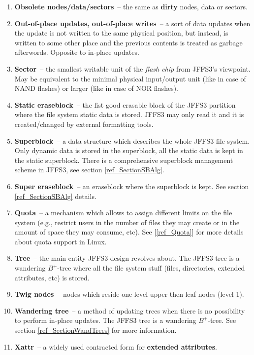 \documentclass[12pt,a4paper,oneside,titlepage]{article}
\begin{document}
\begin{enumerate}
\item \textbf{Obsolete nodes/data/sectors}~-- the same as \textbf{dirty} nodes,
data or sectors.

\item \textbf{Out-of-place updates, out-of-place writes}~-- a sort of data
updates when the update is not written to the same physical position, but
instead, is written to some other place and the previous contents is treated as
garbage afterwords. Opposite to \mbox{in-place} updates.

\item \textbf{Sector}~-- the smallest writable unit of the \emph{flash chip}
from JFFS3's viewpoint. May be equivalent to the minimal physical input/output
unit (like in case of NAND flashes) or larger (like in case of NOR flashes).

\item \textbf{Static eraseblock}~-- the fist good erasable block of the JFFS3
partition where the file system static data is stored. JFFS3 may
only read it and it is created/changed by external formatting tools.

\item \textbf{Superblock}~-- a data structure which describes the whole
JFFS3 file system. Only dynamic data is stored in the superblock, all the
static data is kept in the static superblock. There is a comprehensive
superblock management scheme in JFFS3, see section \ref{ref_SectionSBAlg}.

\item \textbf{Super eraseblock}~-- an eraseblock where the superblock is kept.
See section \ref{ref_SectionSBAlg} details.

\item \textbf{Quota}~-- a mechanism which allows to assign different limits on
the file system (e.g., restrict users in the number of files they may create or
in the amount of space they may consume, etc). See [\ref{ref_Quota}] for more
details about quota support in Linux.

\item \textbf{Tree}~-- the main entity JFFS3 design revolves about. The JFFS3
tree is a wandering \mbox{$B^+$-tree} where all the file system stuff (files,
directories, extended attributes, etc) is stored.

\item \textbf{Twig nodes}~-- nodes which reside one level upper then leaf nodes
(level 1).

\item \textbf{Wandering tree}~-- a method of updating trees when there is no
possibility to perform \mbox{in-place} updates. The JFFS3 tree is a wandering
\mbox{$B^+$-tree}. See section \ref{ref_SectionWandTrees} for more information.

\item \textbf{Xattr}~-- a widely used contracted form for \textbf{extended
attributes}.

\end{enumerate}
\end{document}
